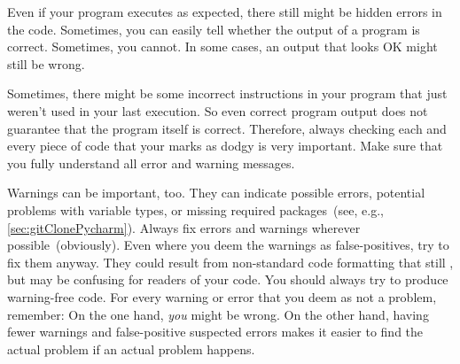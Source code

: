 Even if your program executes as expected, there still might be hidden errors in the code.
Sometimes, you can easily tell whether the output of a program is correct.
Sometimes, you cannot.
In some cases, an output that looks OK might still be wrong.

Sometimes, there might be some incorrect instructions in your program that just weren't used in your last execution.
So even correct program output does not guarantee that the program itself is correct.
Therefore, always checking each and every piece of code that your  marks as dodgy is very important.
Make sure that you fully understand all error and warning messages.

Warnings can be important, too.
They can indicate possible errors, potential problems with variable types, or missing required packages~(see, e.g., \cref{sec:gitClonePycharm}).
Always fix errors and warnings wherever possible~(obviously).
Even where you deem the warnings as false-positives, try to fix them anyway.
They could result from non-standard code formatting that still , but may be confusing for readers of your code.
You should always try to produce warning-free code.
For every warning or error that you deem as not a problem, remember:
On the one hand, \emph{you} might be wrong.
On the other hand, having fewer warnings and false-positive suspected errors makes it easier to find the actual problem if an actual problem happens.%
%
\endhsection%
\FloatBarrier%
\endhsection%
%
